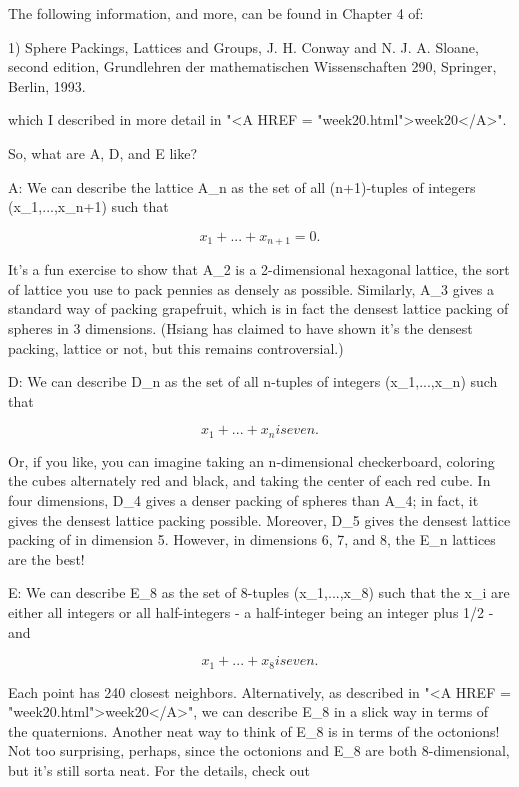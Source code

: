 The following information, and more, can be found in Chapter 4 of:

1) Sphere Packings, Lattices and Groups, J. H. Conway and N. J. A.
Sloane, second edition, Grundlehren der mathematischen Wissenschaften
290, Springer, Berlin, 1993.

which I described in more detail in "<A HREF = "week20.html">week20</A>".  

So, what are A, D, and E like?  

A:  We can describe the lattice A_{n} as the set of all (n+1)-tuples
of integers (x_{1},...,x_{n+1}) such that


$$

                     x_{1} + ... + x_{n+1} = 0.
$$
    

It's a fun exercise to show that A_{2} is a 2-dimensional hexagonal
lattice, the sort of lattice you use to pack pennies as densely as
possible.  Similarly, A_{3} gives a standard way of packing grapefruit,
which is in fact the densest lattice packing of spheres in 3 dimensions.
(Hsiang has claimed to have shown it's the densest packing, lattice or not,
but this remains controversial.)

D: We can describe D_{n} as the set of all n-tuples of integers
(x_{1},...,x_{n}) such that 


$$

                     x_{1} + ... + x_{n} is even.
$$
    

Or, if you like, you can imagine taking an n-dimensional checkerboard,
coloring the cubes alternately red and black, and taking the center of
each red cube.  In four dimensions, D_{4} gives a denser packing of
spheres than A_{4}; in fact, it gives the densest lattice packing
possible.  Moreover, D_{5} gives the densest lattice packing of in
dimension 5.  However, in dimensions 6, 7, and 8, the E_{n} lattices are
the best! 

E: We can describe E_{8} as the set of 8-tuples (x_{1},...,x_{8}) such
that the x_{i} are either all integers or all half-integers - a
half-integer being an integer plus 1/2 - and 


$$

                     x_{1} + ... + x_{8} is even.
$$
    

Each point has 240 closest neighbors.  Alternatively, as described in
"<A HREF = "week20.html">week20</A>", we can describe E_{8} in a slick way in terms of the
quaternions.  Another neat way to think of E_{8} is in terms of the
octonions!  Not too surprising, perhaps, since the octonions and E_{8} are
both 8-dimensional, but it's still sorta neat.  For the details, check
out

